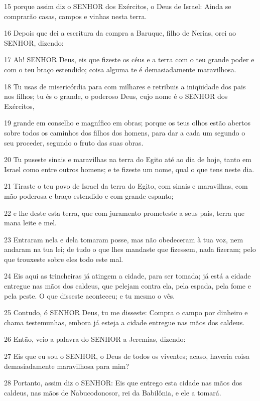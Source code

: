\par 15 porque assim diz o SENHOR dos Exércitos, o Deus de Israel: Ainda se comprarão casas, campos e vinhas nesta terra.
\par 16 Depois que dei a escritura da compra a Baruque, filho de Nerias, orei ao SENHOR, dizendo:
\par 17 Ah! SENHOR Deus, eis que fizeste os céus e a terra com o teu grande poder e com o teu braço estendido; coisa alguma te é demasiadamente maravilhosa.
\par 18 Tu usas de misericórdia para com milhares e retribuis a iniqüidade dos pais nos filhos; tu és o grande, o poderoso Deus, cujo nome é o SENHOR dos Exércitos,
\par 19 grande em conselho e magnífico em obras; porque os teus olhos estão abertos sobre todos os caminhos dos filhos dos homens, para dar a cada um segundo o seu proceder, segundo o fruto das suas obras.
\par 20 Tu puseste sinais e maravilhas na terra do Egito até ao dia de hoje, tanto em Israel como entre outros homens; e te fizeste um nome, qual o que tens neste dia.
\par 21 Tiraste o teu povo de Israel da terra do Egito, com sinais e maravilhas, com mão poderosa e braço estendido e com grande espanto;
\par 22 e lhe deste esta terra, que com juramento prometeste a seus pais, terra que mana leite e mel.
\par 23 Entraram nela e dela tomaram posse, mas não obedeceram à tua voz, nem andaram na tua lei; de tudo o que lhes mandaste que fizessem, nada fizeram; pelo que trouxeste sobre eles todo este mal.
\par 24 Eis aqui as trincheiras já atingem a cidade, para ser tomada; já está a cidade entregue nas mãos dos caldeus, que pelejam contra ela, pela espada, pela fome e pela peste. O que disseste aconteceu; e tu mesmo o vês.
\par 25 Contudo, ó SENHOR Deus, tu me disseste: Compra o campo por dinheiro e chama testemunhas, embora já esteja a cidade entregue nas mãos dos caldeus.
\par 26 Então, veio a palavra do SENHOR a Jeremias, dizendo:
\par 27 Eis que eu sou o SENHOR, o Deus de todos os viventes; acaso, haveria coisa demasiadamente maravilhosa para mim?
\par 28 Portanto, assim diz o SENHOR: Eis que entrego esta cidade nas mãos dos caldeus, nas mãos de Nabucodonosor, rei da Babilônia, e ele a tomará.
